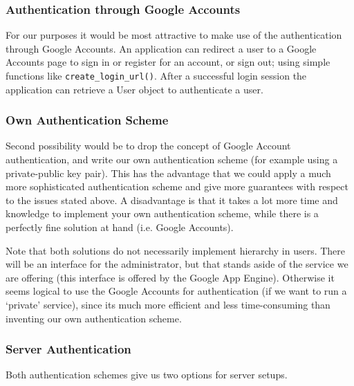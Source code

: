 \subsubsection{Authentication through Google Accounts}
For our purposes it would be most attractive to make use of the authentication
through Google Accounts. An application can redirect a user to a Google Accounts
page to sign in or register for an account, or sign out; using simple functions
like \texttt{create\_login\_url()}. After a successful login session the
application can retrieve a User object to authenticate a user.


\subsubsection{Own Authentication Scheme}
Second possibility would be to drop the concept of Google Account authentication,
and write our own authentication scheme (for example using a private-public key
pair). This has the advantage that we could apply a much more sophisticated
authentication scheme and give more guarantees with respect to the issues stated
above. A disadvantage is that it takes a lot more time and knowledge to implement
your own authentication scheme, while there is a perfectly fine solution at hand
(i.e. Google Accounts).

Note that both solutions do not necessarily implement hierarchy in users. There
will be an interface for the administrator, but that stands aside of the service
we are offering (this interface is offered by the Google App Engine). Otherwise
it seems logical to use the Google Accounts for authentication (if we want to run
a `private' service), since its much more efficient and less time-consuming than
inventing our own authentication scheme.


\subsubsection{Server Authentication}
Both authentication schemes give us two options for server setups.


